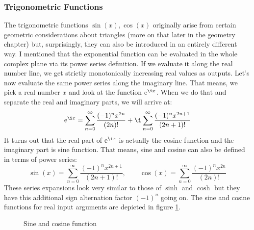 \subsubsection{Trigonometric Functions}
The trigonometric functions $\sin(x), \cos(x)$ originally arise from certain geometric considerations about triangles (more on that later in the geometry chapter) but, surprisingly, they can also be introduced in an entirely different way. I mentioned that the exponential function can be evaluated in the whole complex plane via its power series definition. If we evaluate it along the real number line, we get strictly monotonically increasing real values as outputs. Let's now evaluate the same power series along the imaginary line. That means, we pick a real number $x$ and look at the function $\e^{\i x}$. When we do that and separate the real and imaginary parts, we will arrive at:
\begin{equation}
\e^{\i x} =      \sum_{n=0}^{\infty} \frac{(-1)^n x^{2n}  }{(2n)!} 
            + \i \sum_{n=0}^{\infty} \frac{(-1)^n x^{2n+1}}{(2n+1)!}
\end{equation}
It turns out that the real part of $\e^{\i x}$ is actually the cosine function and the imaginary part is sine function. That means, sine and cosine can also be defined in terms of power series:
\begin{equation}
\sin(x) = \sum_{n=0}^{\infty} \frac{(-1)^n x^{2n+1}}{(2n+1)!}, \qquad
\cos(x) = \sum_{n=0}^{\infty} \frac{(-1)^n x^{2n}  }{(2n)!}
\end{equation}
These series expansions look very similar to those of $\sinh$ and $\cosh$ but they have this additional sign alternation factor $(-1)^n$ going on. The sine and cosine functions for real input arguments are depicted in figure \ref{Fig:SineAndCosine}.

\begin{figure}[h]
\centering
\caption{Sine and cosine function}
\label{Fig:SineAndCosine}
\end{figure}

